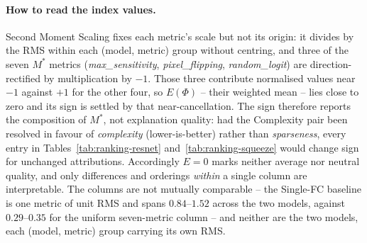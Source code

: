 \paragraph{How to read the index values.}
Second Moment Scaling fixes each metric's scale but not its origin: it
divides by the RMS within each (model, metric) group without centring, and
three of the seven $M^{*}$ metrics (\emph{max\_sensitivity},
\emph{pixel\_flipping}, \emph{random\_logit}) are direction-rectified by
multiplication by $-1$. Those three contribute normalised values near $-1$
against $+1$ for the other four, so $E(\Phi)$ -- their weighted mean -- lies
close to zero and its sign is settled by that near-cancellation. The sign
therefore reports the composition of $M^{*}$, not explanation quality: had
the Complexity pair been resolved in favour of \emph{complexity}
(lower-is-better) rather than \emph{sparseness}, every entry in
Tables~\ref{tab:ranking-resnet} and~\ref{tab:ranking-squeeze} would change
sign for unchanged attributions. Accordingly $E = 0$ marks neither average
nor neutral quality, and only differences and orderings \emph{within} a
single column are interpretable. The columns are not mutually
comparable -- the Single-FC baseline is one metric of unit RMS and spans $0.84$--$1.52$
across the two models, against $0.29$--$0.35$ for the uniform seven-metric
column -- and neither are the two models, each (model, metric) group
carrying its own RMS.







